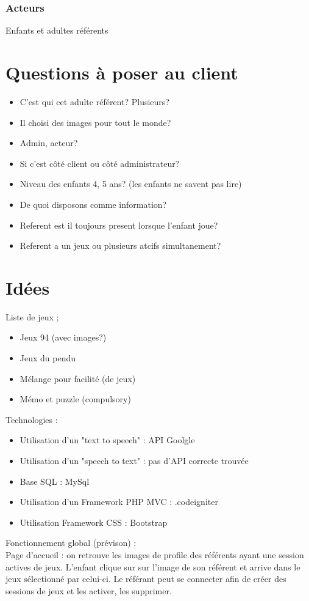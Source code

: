 \documentclass[12pt,a4paper]{report}
\begin{document}
\subsection{Acteurs}
Enfants et adultes référents
\chapter{Questions à poser au client}
\begin{itemize}
\item C'est qui cet adulte référent? Plusieurs?
\item Il choisi des images pour tout le monde?
\item Admin, acteur?
\item Si c'est côté client ou côté administrateur?
\item Niveau des enfants 4, 5 ans? (les enfants ne savent pas lire)
\item De quoi disposons comme information?
\item Referent est il toujours present lorsque l'enfant joue?
\item Referent a un jeux ou plusieurs atcifs simultanement?
\end{itemize}
\chapter{Idées}
Liste de jeux ;
\begin{itemize}
\item Jeux 94 (avec images?)
\item Jeux du pendu
\item Mélange pour facilité (de jeux)
\item Mémo et puzzle (compulsory)
\end{itemize}

\medbreak
Technologies :
\begin{itemize}
\item Utilisation d'un "text to speech" : API Goolgle
\item Utilisation d'un "speech to text" : pas d'API correcte trouvée
\item Base SQL : MySql
\item Utilisation d'un Framework PHP MVC : .codeigniter
\item Utilisation Framework CSS : Bootstrap
\end{itemize}

\medbreak
Fonctionnement global (prévison) :
\\Page d'accueil : on retrouve les images de profile des référents ayant une session actives de jeux.
L'enfant clique sur sur l'image de son référent et arrive dans le jeux sélectionné par celui-ci.
Le référant peut se connecter afin de créer des sessions de jeux et les activer, les supprimer.
\end{document}
